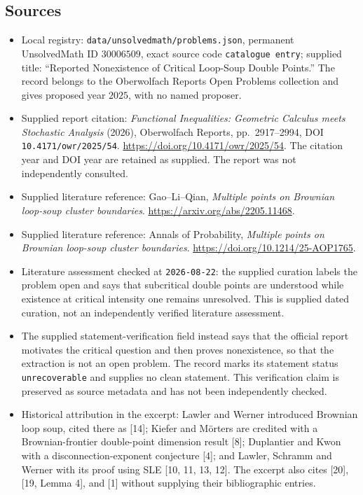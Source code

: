 \documentclass[11pt]{article}
\begin{document}
\subsection{Sources}
\begin{itemize}
\item Local registry: \texttt{data/unsolvedmath/problems.json}, permanent UnsolvedMath ID \(30006509\), exact source code \texttt{catalogue entry}; supplied title: ``Reported Nonexistence of Critical Loop-Soup Double Points.'' The record belongs to the Oberwolfach Reports Open Problems collection and gives proposed year \(2025\), with no named proposer.
\item Supplied report citation: \emph{Functional Inequalities: Geometric Calculus meets Stochastic Analysis} (2026), Oberwolfach Reports, pp.~2917--2994, DOI \texttt{10.4171/owr/2025/54}. \url{https://doi.org/10.4171/owr/2025/54}. The citation year and DOI year are retained as supplied. The report was not independently consulted.
\item Supplied literature reference: Gao--Li--Qian, \emph{Multiple points on Brownian loop-soup cluster boundaries}. \url{https://arxiv.org/abs/2205.11468}.
\item Supplied literature reference: Annals of Probability, \emph{Multiple points on Brownian loop-soup cluster boundaries}. \url{https://doi.org/10.1214/25-AOP1765}.
\item Literature assessment checked at \texttt{2026-08-22}: the supplied curation labels the problem open and says that subcritical double points are understood while existence at critical intensity one remains unresolved. This is supplied dated curation, not an independently verified literature assessment.
\item The supplied statement-verification field instead says that the official report motivates the critical question and then proves nonexistence, so that the extraction is not an open problem. The record marks its statement status \texttt{unrecoverable} and supplies no clean statement. This verification claim is preserved as source metadata and has not been independently checked.
\item Historical attribution in the excerpt: Lawler and Werner introduced Brownian loop soup, cited there as [14]; Kiefer and M\"orters are credited with a Brownian-frontier double-point dimension result [8]; Duplantier and Kwon with a disconnection-exponent conjecture [4]; and Lawler, Schramm and Werner with its proof using SLE [10, 11, 13, 12]. The excerpt also cites [20], [19, Lemma 4], and [1] without supplying their bibliographic entries.
\end{itemize}
\end{document}

